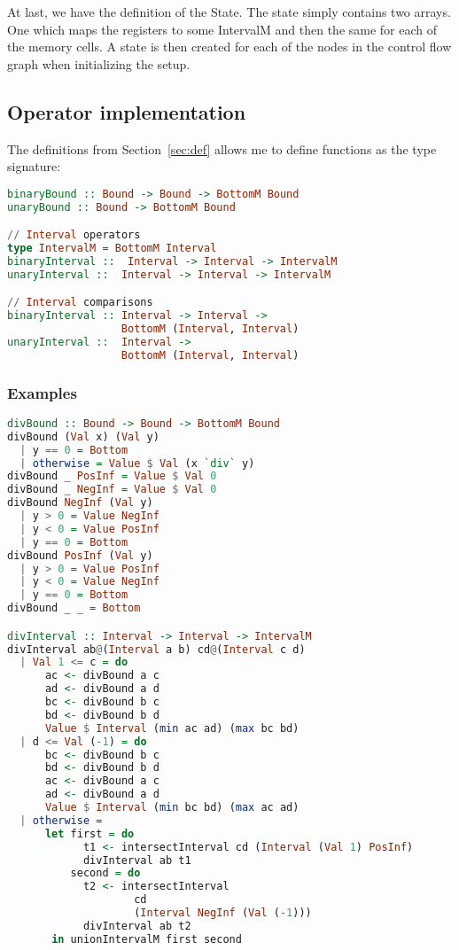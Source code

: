 At last, we have the definition of the State. The state simply contains two
arrays. One which maps the registers to some IntervalM and then the same for
each of the memory cells. A state is then created for each of the nodes in the
control flow graph when initializing the setup.

\subsection{Operator implementation}\label{sec:opImp}
The definitions from Section~\ref{sec:def} allows me to define functions as the type signature:
\begin{lstlisting}[language={haskell}]
binaryBound :: Bound -> Bound -> BottomM Bound
unaryBound :: Bound -> BottomM Bound

// Interval operators
type IntervalM = BottomM Interval
binaryInterval ::  Interval -> Interval -> IntervalM
unaryInterval ::  Interval -> Interval -> IntervalM

// Interval comparisons
binaryInterval :: Interval -> Interval -> 
                  BottomM (Interval, Interval)
unaryInterval ::  Interval -> 
                  BottomM (Interval, Interval)
\end{lstlisting}

\subsubsection*{Examples}
\begin{lstlisting}[language={haskell}, caption={Full division implementation}, label={lst:div}]
divBound :: Bound -> Bound -> BottomM Bound
divBound (Val x) (Val y)
  | y == 0 = Bottom
  | otherwise = Value $ Val (x `div` y)
divBound _ PosInf = Value $ Val 0
divBound _ NegInf = Value $ Val 0
divBound NegInf (Val y)
  | y > 0 = Value NegInf
  | y < 0 = Value PosInf
  | y == 0 = Bottom
divBound PosInf (Val y)
  | y > 0 = Value PosInf
  | y < 0 = Value NegInf
  | y == 0 = Bottom
divBound _ _ = Bottom

divInterval :: Interval -> Interval -> IntervalM
divInterval ab@(Interval a b) cd@(Interval c d)
  | Val 1 <= c = do
      ac <- divBound a c
      ad <- divBound a d
      bc <- divBound b c
      bd <- divBound b d
      Value $ Interval (min ac ad) (max bc bd)
  | d <= Val (-1) = do
      bc <- divBound b c
      bd <- divBound b d
      ac <- divBound a c
      ad <- divBound a d
      Value $ Interval (min bc bd) (max ac ad)
  | otherwise =
      let first = do
            t1 <- intersectInterval cd (Interval (Val 1) PosInf)
            divInterval ab t1
          second = do
            t2 <- intersectInterval 
                    cd
                    (Interval NegInf (Val (-1)))
            divInterval ab t2
       in unionIntervalM first second
\end{lstlisting}  
